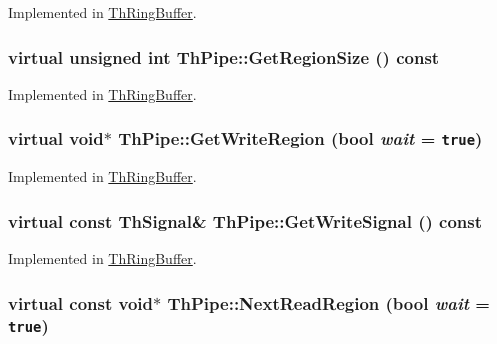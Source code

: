 Implemented in \hyperlink{class_th_ring_buffer_97f956255ad5d7b0dad71096e7c79423}{ThRingBuffer}.\hypertarget{class_th_pipe_d2327f51f3cda813c426e9291b706edc}{
\subsubsection[{GetRegionSize}]{\setlength{\rightskip}{0pt plus 5cm}virtual unsigned int ThPipe::GetRegionSize () const}}
\label{class_th_pipe_d2327f51f3cda813c426e9291b706edc}




Implemented in \hyperlink{class_th_ring_buffer_15dac6f34adbef384a16fa2f184eb372}{ThRingBuffer}.\hypertarget{class_th_pipe_1a4ac6e97ef560473d9a400b744c5ece}{
\subsubsection[{GetWriteRegion}]{\setlength{\rightskip}{0pt plus 5cm}virtual void$\ast$ ThPipe::GetWriteRegion (bool {\em wait} = {\tt true})}}
\label{class_th_pipe_1a4ac6e97ef560473d9a400b744c5ece}




Implemented in \hyperlink{class_th_ring_buffer_6a921c362dd2cfe8173f065c884f34ac}{ThRingBuffer}.\hypertarget{class_th_pipe_ec482a45f880a2c701c13356ffa81f52}{
\subsubsection[{GetWriteSignal}]{\setlength{\rightskip}{0pt plus 5cm}virtual const {\bf ThSignal}\& ThPipe::GetWriteSignal () const}}
\label{class_th_pipe_ec482a45f880a2c701c13356ffa81f52}




Implemented in \hyperlink{class_th_ring_buffer_bc8836a944eb477e1f3e7b505d589ac9}{ThRingBuffer}.\hypertarget{class_th_pipe_3b31426377c575c926d8c0973213b151}{
\subsubsection[{NextReadRegion}]{\setlength{\rightskip}{0pt plus 5cm}virtual const void$\ast$ ThPipe::NextReadRegion (bool {\em wait} = {\tt true})}}
\label{class_th_pipe_3b31426377c575c926d8c0973213b151}




